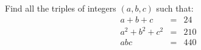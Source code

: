 Find all the triples of integers $ (a, b,c)$ such that:\[ \begin{array}{ccc}a+b+c &=& 24\\ a^{2}+b^{2}+c^{2}&=& 210\\ abc &=& 440\end{array}\]